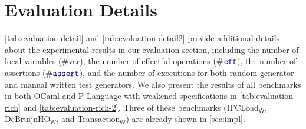 \newpage
\section{Evaluation Details}\label{sec:tech:evaluation}

\autoref{tab:evaluation-detail} and \autoref{tab:evaluation-detail2}
provide additional details about the experimental results in our
evaluation section, including the number of local variables (\#var),
the number of effectful operations (\#$\mykw{eff}$), the number of
assertions (\#$\mykw{assert}$), and the number of executions for both
random generator and manual written test generators. 
We also present the results of all benchmarks in both OCaml and P Language with weakened specifications in \autoref{tab:evaluation-rich} and \autoref{tab:evaluation-rich-2}. Three of these benchmarks (\textsf{IFCLoad}$_{\mathsf{W}}$, \textsf{DeBruijnHO}$_{\mathsf{W}}$, and \textsf{Transaction}$_{\mathsf{W}}$) are already shown in \autoref{sec:impl}.

